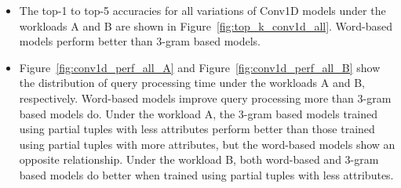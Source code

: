 
\begin{itemize}
	\item The top-1 to top-5 accuracies for all variations of Conv1D models under the workloads A and B are shown in Figure~\ref{fig:top_k_conv1d_all}. 
	Word-based models perform better than 3-gram based models.
	\item Figure~\ref{fig:conv1d_perf_all_A} and Figure~\ref{fig:conv1d_perf_all_B} show the distribution of query processing time under the workloads A and B, respectively. 
	Word-based models improve query processing more than 3-gram based models do. 
	Under the workload A, the 3-gram based models trained using partial tuples with less attributes perform better than those trained using partial tuples with more attributes, but the word-based models show an opposite relationship.
	Under the workload B, both word-based and 3-gram based models do better when trained using partial tuples with less attributes.
\end{itemize}
